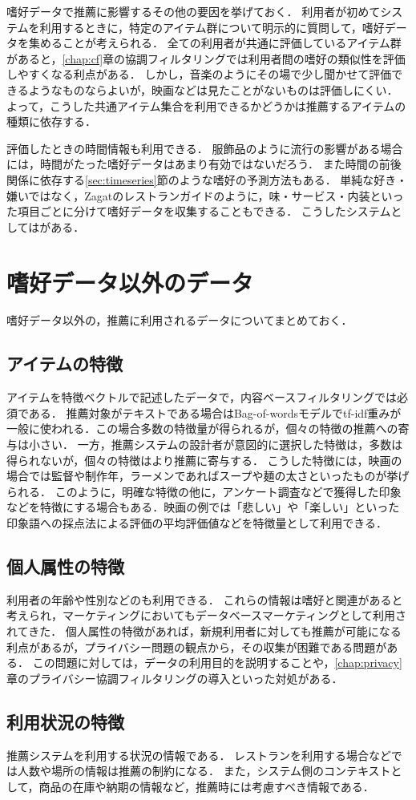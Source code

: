 嗜好データで推薦に影響するその他の要因を挙げておく．
利用者が初めてシステムを利用するときに，特定のアイテム群について明示的に質問して，嗜好データを集めることが考えられる．
全ての利用者が共通に評価しているアイテム群があると，\ref{chap:cf}章の協調フィルタリングでは利用者間の嗜好の類似性を評価しやすくなる利点がある．
しかし，音楽のようにその場で少し聞かせて評価できるようなものならよいが，映画などは見たことがないものは評価しにくい．
よって，こうした共通アイテム集合を利用できるかどうかは推薦するアイテムの種類に依存する．

評価したときの時間情報も利用できる．
服飾品のように流行の影響がある場合には，時間がたった嗜好データはあまり有効ではないだろう．
また時間の前後関係に依存する\ref{sec:timeseries}節のような嗜好の予測方法もある．
単純な好き・嫌いではなく，Zagatのレストランガイドのように，味・サービス・内装といった項目ごとに分けて嗜好データを収集することもできる．
こうしたシステムとしては\cite{ieeem:07:02}がある．

\section{嗜好データ以外のデータ}
\label{sec:featuredata}

嗜好データ以外の，推薦に利用されるデータについてまとめておく．

\subsection{アイテムの特徴}

アイテムを特徴ベクトルで記述したデータで，内容ベースフィルタリングでは必須である．
推薦対象がテキストである場合はBag-of-wordsモデルでtf-idf重み\cite{jb:012:00}が一般に使われる．この場合多数の特徴量が得られるが，個々の特徴の推薦への寄与は小さい．
一方，推薦システムの設計者が意図的に選択した特徴は，多数は得られないが，個々の特徴はより推薦に寄与する．
こうした特徴には，映画の場合では監督や制作年，ラーメンであればスープや麺の太さといったものが挙げられる．
このように，明確な特徴の他に，アンケート調査などで獲得した印象などを特徴にする場合もある．映画の例では「悲しい」や「楽しい」といった印象語への採点法による評価の平均評価値などを特徴量として利用できる．

\subsection{個人属性の特徴}

利用者の年齢や性別などのも利用できる\cite{ej:050}．
これらの情報は嗜好と関連があると考えられ，マーケティングにおいてもデータベースマーケティングとして利用されてきた\cite{dmkd:01:01}．
個人属性の特徴があれば，新規利用者に対しても推薦が可能になる利点があるが，プライバシー問題の観点から，その収集が困難である問題がある．
この問題に対しては，データの利用目的を説明すること\cite{sigir:01:01}や，\ref{chap:privacy}章のプライバシー協調フィルタリングの導入といった対処がある．

\subsection{利用状況の特徴}

推薦システムを利用する状況の情報である．
レストランを利用する場合などでは人数や場所の情報は推薦の制約になる\cite{tjsai:06:01,trjsai:06:01}．
また，システム側のコンテキストとして，商品の在庫や納期の情報など，推薦時には考慮すべき情報である．

